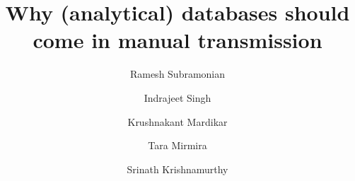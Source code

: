 \documentclass[sigconf]{acmart}
\begin{document}
\title{Why (analytical) databases should come in manual transmission}


\author{Ramesh Subramonian}

\author{Indrajeet Singh}

\author{Krushnakant Mardikar}

\author{Tara Mirmira}

\author{Srinath Krishnamurthy}

  \renewcommand{\shortauthors}{R. Subramonian et al}




%
%


\maketitle




% 
%  
\end{document}
